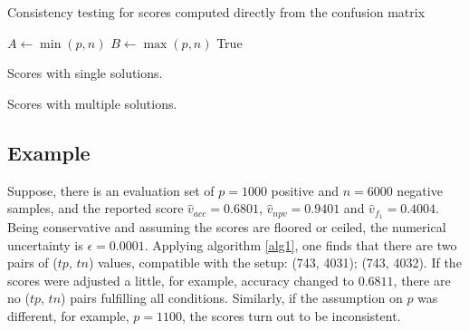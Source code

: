 \documentclass[3p, times]{elsarticle}
\begin{document}

\begin{algorithm}[t]
    \caption{Consistency testing for scores computed directly from the confusion matrix}\label{alg1}
    \begin{small}
    $A \gets \min(p, n)$\;
    $B \gets \max(p, n)$\;
    \Return True\;
    \end{small}
    \end{algorithm}

\begin{table}[t!]
\caption{Scores with single solutions.}
\label{tab2}
\begin{scriptsize}
\begin{center}

\end{center}
\end{scriptsize}
\end{table}

\begin{table}[t!]
\caption{Scores with multiple solutions.}
\label{tab3}
\begin{scriptsize}
\begin{center}

\end{center}
\end{scriptsize}
\end{table}

\subsection{Example}
\label{sec:index}

Suppose, there is an evaluation set of $p=1000$ positive and $n=6000$ negative samples, and the reported score $\hat{v}_{acc} = 0.6801$, $\hat{v}_{npv} = 0.9401$ and $\hat{v}_{f_1} = 0.4004$. Being conservative and assuming the scores are floored or ceiled, the numerical uncertainty is $\epsilon = 0.0001$. Applying algorithm \ref{alg1}, one finds that there are two pairs of ($tp$, $tn$) values, compatible with the setup: (743, 4031); (743, 4032). If the scores were adjusted a little, for example, accuracy changed to $0.6811$, there are no ($tp$, $tn$) pairs fulfilling all conditions. Similarly, if the assumption on $p$ was different, for example, $p=1100$, the scores turn out to be inconsistent.
\end{document}
